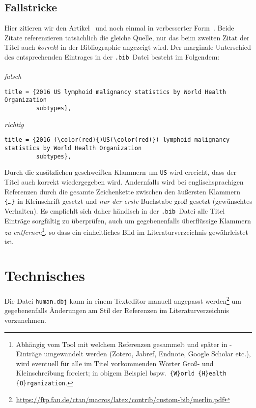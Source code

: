 \documentclass[a4paper,10pt]{scrartcl}
\renewcommand{\cite}{\citep}  %
\begin{document}
\subsection{Fallstricke}
Hier zitieren wir den Artikel~\cite{Teras2016_FALSCH} und noch einmal in
verbesserter Form~\cite{Teras2016_RICHTIG}. Beide Zitate referenzieren
tats\"achlich die gleiche Quelle, nur das beim zweiten Zitat der
Titel auch \emph{korrekt} in der Bibliographie angezeigt wird. Der
marginale Unterschied des entsprechenden Eintrages
in der \verb|.bib|~Datei besteht im Folgendem:\\\\
\emph{falsch}
\begin{Verbatim}
title = {2016 US lymphoid malignancy statistics by World Health Organization
         subtypes},
\end{Verbatim}
\emph{richtig}
\begin{Verbatim}[commandchars=\\\(\)]
title = {2016 (\color(red){)US(\color(red)}) lymphoid malignancy statistics by World Health Organization
         subtypes},
\end{Verbatim}
Durch die zusätzlichen geschweiften Klammern um \texttt{US} wird erreicht, dass der Titel
auch korrekt wiedergegeben wird. Andernfalls wird bei englischsprachigen
Referenzen durch  die gesamte Zeichenkette zwischen den
\"au{\ss}ersten Klammern \texttt{\{\ldots \}} in Kleinschrift gesetzt und
\emph{nur der erste} Buchstabe gro{\ss} gesetzt (gewünschtes Verhalten). Es empfiehlt sich daher händisch in
der
\verb|.bib|~Datei alle Titel Einträge sorgfältig zu überprüfen, auch um
gegebenenfalls überflüssige Klammern \emph{zu entfernen}\footnote{Abhängig vom
Tool mit welchem Referenzen gesammelt und später in -Einträge
umgewandelt werden (Zotero, Jabref, Endnote, Google Scholar etc.), wird
eventuell für alle im Titel vorkommenden Wörter
Gro{\ss}- und Kleinschreibung forciert; in obigem Beispiel bspw.\ \verb|{W}orld {H}ealth {O}rganization|.},
so dass ein einheitliches Bild im Literaturverzeichnis gewährleistet ist.

\section{Technisches}
Die Datei \verb|human.dbj| kann in einem Texteditor manuell angepasst
werden\footnote{%
\url{https://ftp.fau.de/ctan/macros/latex/contrib/custom-bib/merlin.pdf}} um
gegebenenfalls Änderungen am Stil der Referenzen im Literaturverzeichnis
vorzunehmen.
\end{document}
